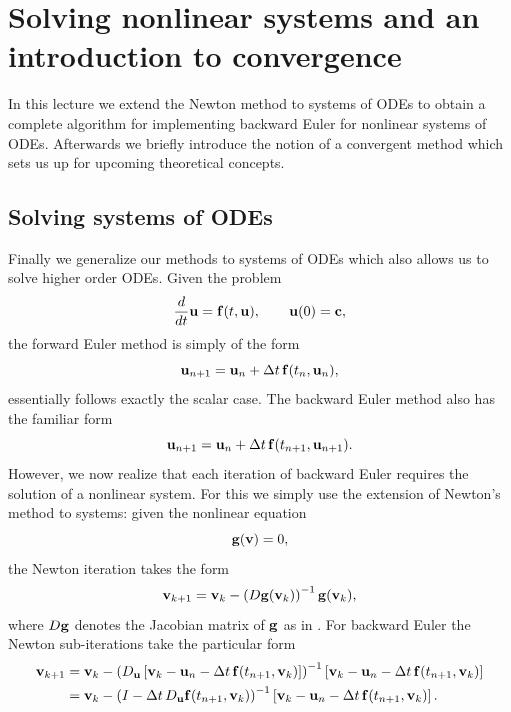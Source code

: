 \chapter{Solving nonlinear systems and an introduction 
to convergence}
\label{lec:accuracy}

In this lecture we extend the Newton method to systems of 
ODEs to obtain a complete algorithm for implementing 
backward Euler for nonlinear systems of ODEs. 
Afterwards we briefly introduce the notion of a 
convergent method which sets us up for upcoming 
theoretical concepts.


\section{Solving systems of ODEs}

Finally we generalize our methods to systems of ODEs which also allows us to 
solve higher order ODEs. Given the problem 
\begin{equation*}
    \frac{d}{dt} \mathbf{u} = \mathbf{f}(t, \mathbf{u}), \qquad \mathbf{u}(0) = \mathbf{c},
\end{equation*}
the forward Euler method is simply of the form 
\begin{equation*}
    \mathbf{u}_{n+1} = \mathbf{u}_n + \Delta t \, \mathbf{f}(t_n, \mathbf{u}_n),
\end{equation*}
essentially follows exactly the scalar case. The backward Euler method 
also has the familiar form 
\begin{equation*}
    \mathbf{u}_{n+1} = \mathbf{u}_n + \Delta t \, \mathbf{f}(t_{n+1}, \mathbf{u}_{n+1}).
\end{equation*} 
However, we now realize that each iteration of backward Euler requires the solution 
of a nonlinear system. For this we simply use the extension of Newton's method to systems: 
given the nonlinear equation 
\begin{equation*}
    \mathbf{g}(\mathbf{v}) = 0, 
\end{equation*}
the Newton iteration takes the form 
\begin{equation*}
    \mathbf{v}_{k+1} = \mathbf{v}_{k} - \left( D \mathbf{g}(\mathbf{v}_{k}) \right)^{-1} \mathbf{g}(\mathbf{v}_{k}),
\end{equation*}
where $D \mathbf{g}$ denotes the Jacobian matrix of $\mathbf{g}$ as in .
For backward Euler the Newton sub-iterations take the particular form 
\begin{equation*}
    \begin{aligned}
    \mathbf{v}_{k+1} & = \mathbf{v}_{k} - \left( D_{\mathbf{u}} \left[ \mathbf{v}_{k} - \mathbf{u}_n - \Delta t \, \mathbf{f}(t_{n+1}, \mathbf{v}_{k}) \right] \right)^{-1} \left[ \mathbf{v}_{k} - \mathbf{u}_n - \Delta t \, \mathbf{f}(t_{n+1}, \mathbf{v}_{k}) \right] \\
    & = \mathbf{v}_{k} - \left( I - \Delta t \, D_{\mathbf{u}} \mathbf{f}(t_{n+1}, \mathbf{v}_{k}) \right)^{-1} \left[ \mathbf{v}_{k} - \mathbf{u}_n - \Delta t \, \mathbf{f}(t_{n+1}, \mathbf{v}_{k}) \right].
\end{aligned}
\end{equation*}

